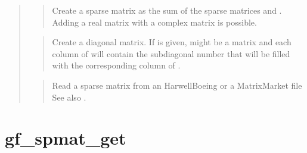 \documentclass[a4paper,11pt,english]{sphinxmanual}
\begin{document}
\begin{quote}
\begin{quote}

Create a sparse matrix as the sum of the sparse matrices  and .
Adding a real matrix with a complex matrix is possible.
\end{quote}

\begin{quote}

Create a diagonal matrix. If  is given,  might be a matrix and
each column of  will contain the sub\sphinxhyphen{}diagonal number that will be
filled with the corresponding column of .
\end{quote}

\begin{quote}

Read a sparse matrix from an Harwell\sphinxhyphen{}Boeing or a Matrix\sphinxhyphen{}Market file
See also .
\end{quote}
\end{quote}


\section{gf\_spmat\_get}
\label{\detokenize{matlab_octave/cmdref_gf_spmat_get:gf-spmat-get}}\label{\detokenize{matlab_octave/cmdref_gf_spmat_get::doc}}
\end{document}
